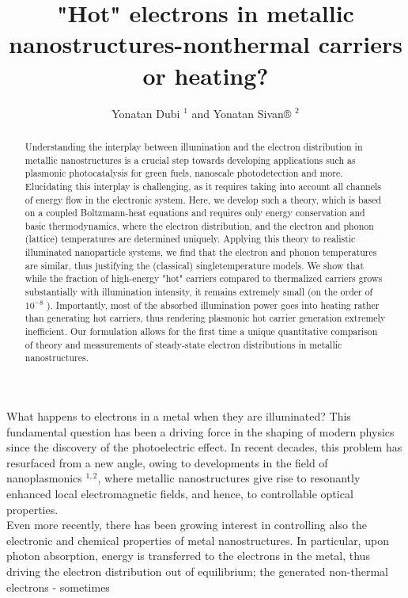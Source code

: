 \documentclass[10pt]{article}
\title{"Hot" electrons in metallic nanostructures-nonthermal carriers or heating? }
\author{Yonatan Dubi ${ }^{1}$ and Yonatan Sivan® ${ }^{2}$}
\date{}
\begin{document}
\maketitle
\captionsetup{singlelinecheck=false}


\begin{abstract}
Understanding the interplay between illumination and the electron distribution in metallic nanostructures is a crucial step towards developing applications such as plasmonic photocatalysis for green fuels, nanoscale photodetection and more. Elucidating this interplay is challenging, as it requires taking into account all channels of energy flow in the electronic system. Here, we develop such a theory, which is based on a coupled Boltzmann-heat equations and requires only energy conservation and basic thermodynamics, where the electron distribution, and the electron and phonon (lattice) temperatures are determined uniquely. Applying this theory to realistic illuminated nanoparticle systems, we find that the electron and phonon temperatures are similar, thus justifying the (classical) singletemperature models. We show that while the fraction of high-energy "hot" carriers compared to thermalized carriers grows substantially with illumination intensity, it remains extremely small (on the order of $10^{-8}$ ). Importantly, most of the absorbed illumination power goes into heating rather than generating hot carriers, thus rendering plasmonic hot carrier generation extremely inefficient. Our formulation allows for the first time a unique quantitative comparison of theory and measurements of steady-state electron distributions in metallic nanostructures.
\end{abstract}

What happens to electrons in a metal when they are illuminated? This fundamental question has been a driving force in the shaping of modern physics since the discovery of the photoelectric effect. In recent decades, this problem has resurfaced from a new angle, owing to developments in the field of nanoplasmonics ${ }^{1,2}$, where metallic nanostructures give rise to resonantly enhanced local electromagnetic fields, and hence, to controllable optical properties.\\
Even more recently, there has been growing interest in controlling also the electronic and chemical properties of metal nanostructures. In particular, upon photon absorption, energy is transferred to the electrons in the metal, thus driving the electron distribution out of equilibrium; the generated non-thermal electrons - sometimes
\end{document}
